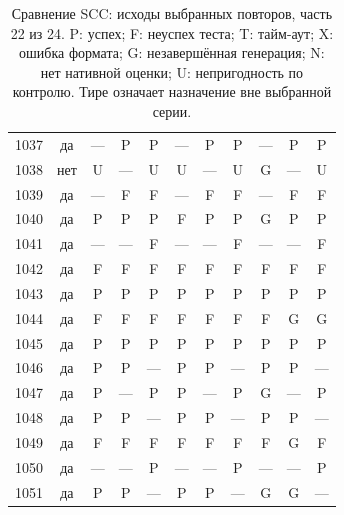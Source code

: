 \begin{table}[p]
\begin{tabular*}{\textwidth}{@{\extracolsep{\fill}}rc*{9}{c}@{}}
1037 & да & — & P & P & — & P & P & — & P & P\\
1038 & нет & U & — & U & U & — & U & G & — & U\\
1039 & да & — & F & F & — & F & F & — & F & F\\
1040 & да & P & P & P & F & P & P & G & P & P\\
1041 & да & — & — & F & — & — & F & — & — & F\\
1042 & да & F & F & F & F & F & F & F & F & F\\
1043 & да & P & P & P & P & P & P & P & P & P\\
1044 & да & F & F & F & F & F & F & F & G & G\\
1045 & да & P & P & P & P & P & P & P & P & P\\
1046 & да & P & P & — & P & P & — & P & P & —\\
1047 & да & P & — & P & P & — & P & G & — & P\\
1048 & да & P & P & — & P & P & — & P & P & —\\
1049 & да & F & F & F & F & F & F & F & G & F\\
1050 & да & — & — & P & — & — & P & — & — & P\\
1051 & да & P & P & — & P & P & — & G & G & —\\
\bottomrule\end{tabular*}
\caption{Сравнение SCC: исходы выбранных повторов, часть 22 из 24. P: успех; F: неуспех теста; T: тайм-аут; X: ошибка формата; G: незавершённая генерация; N: нет нативной оценки; U: непригодность по контролю. Тире означает назначение вне выбранной серии.}
\end{table}
\clearpage
